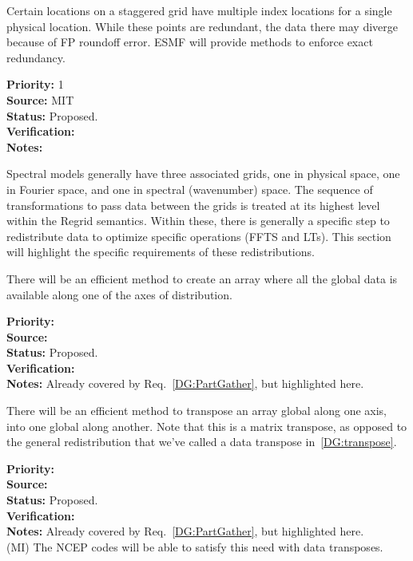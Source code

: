 Certain locations on a staggered grid have multiple index locations
for a single physical location. While these points are redundant, the
data there may diverge because of FP roundoff error. ESMF will provide
methods to enforce exact redundancy.

\begin{reqlist}
{\bf Priority:} 1 \\ 
{\bf Source:} MIT \\
{\bf Status:} Proposed. \\
{\bf Verification:} \\
{\bf Notes:}
\end{reqlist}


Spectral models generally have three associated grids, one in physical
space, one in Fourier space, and one in spectral (wavenumber) space. The sequence of
transformations to pass data between the grids is treated at its
highest level within the Regrid semantics. Within these, there is
generally a specific step to redistribute data to optimize specific
operations (FFTS and LTs). This section will highlight the specific
requirements of these redistributions.


There will be an efficient method to create an array where all the
global data is available along one of the axes of distribution.

\begin{reqlist}
{\bf Priority:} \\
{\bf Source:} \\
{\bf Status:} Proposed. \\
{\bf Verification:} \\
{\bf Notes:} Already covered by Req.~\ref{DG:PartGather}, but
  highlighted here.
\end{reqlist}


There will be an efficient method to transpose an array global along
one axis, into one global along another. Note that this is a matrix
transpose, as opposed to the general redistribution that we've called
a data transpose in~\ref{DG:transpose}.

\begin{reqlist}
{\bf Priority:} \\
{\bf Source:} \\
{\bf Status:} Proposed. \\
{\bf Verification:} \\
{\bf Notes:} Already covered by Req.~\ref{DG:PartGather}, but
  highlighted here.
  \\ (MI) The NCEP codes will be able to satisfy this need with data transposes.
\end{reqlist}

